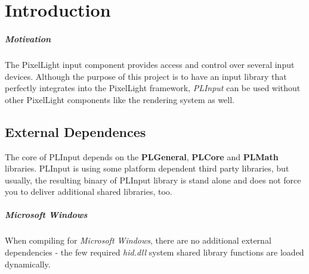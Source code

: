 \chapter{Introduction}


\paragraph{Motivation}
The PixelLight input component provides access and control over several input devices. Although the purpose of this project is to have an input library that perfectly integrates into the PixelLight framework, \emph{PLInput} can be used without other PixelLight components like the rendering system as well.




\section{External Dependences}
The core of PLInput depends on the \textbf{PLGeneral}, \textbf{PLCore} and \textbf{PLMath} libraries. PLInput is using some platform dependent third party libraries, but usually, the resulting binary of PLInput library is stand alone and does not force you to deliver additional shared libraries, too.


\paragraph{Microsoft Windows}
When compiling for \emph{Microsoft Windows}, there are no additional external dependencies - the few required \emph{hid.dll} system shared library functions are loaded dynamically.
